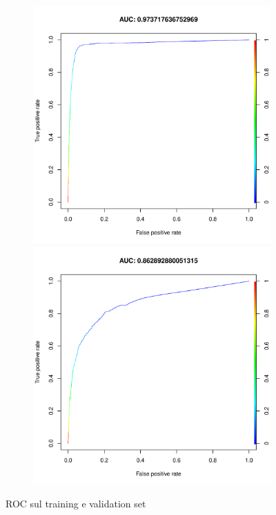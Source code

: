 \begin{figure}[htb]
	\centering
	\begin{subfigure}[t]{1\textwidth}
		\begin{minipage}[t]{0.475\textwidth}
			\includegraphics[width=\textwidth]{images/ml/random_forest/HoldoutRF/auc_train}
		\end{minipage}
		\hfill
		\begin{minipage}[t]{0.475\textwidth}
			\includegraphics[width=\textwidth]{images/ml/random_forest/HoldoutRF/auc_test}
		\end{minipage}
	\end{subfigure}
	\caption{ROC sul training e validation set}
	\label{fig:rf_roc}
\end{figure}


